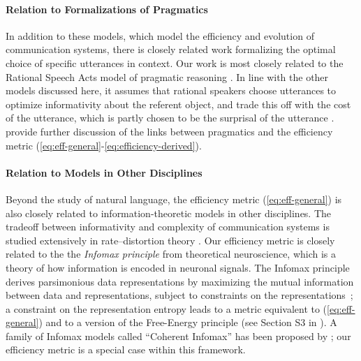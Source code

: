 \documentclass[10pt,twoside,lineno]{article}
\begin{document}
\paragraph{Relation to Formalizations of Pragmatics}
In addition to these models, which model the efficiency and evolution of communication systems, there is closely related work formalizing the optimal choice of specific utterances in context.
Our work is most closely related to the Rational Speech Acts model of pragmatic reasoning \cite{frank2012predicting,goodman2013knowledge, kao2014nonliteral}.
In line with the other models discussed here, it assumes that rational speakers choose utterances to optimize informativity about the referent object, and trade this off with the cost of the utterance, which is partly chosen to be the surprisal of the utterance \cite{bennett2018extremely, hahn2018information, peloquin2019interactions}.
\citet{peloquin2019interactions} provide further discussion of the links between pragmatics and the efficiency metric (\ref{eq:eff-general}-\ref{eq:efficiency-derived}).

\paragraph{Relation to Models in Other Disciplines}
Beyond the study of natural language, the efficiency metric (\ref{eq:eff-general}) is also closely related to information-theoretic models in other disciplines.
The tradeoff between informativity and complexity of communication systems is studied extensively in rate--distortion theory \cite{berger1971rate}.
Our efficiency metric is closely related to the the \emph{Infomax principle} from theoretical neuroscience, which is a theory of how information is encoded in neuronal signals.
The Infomax principle derives parsimonious data representations by maximizing the mutual information between data and representations, subject to constraints on the representations~\cite{linsker1988self}; a constraint on the representation entropy leads to a metric equivalent to (\ref{eq:eff-general}) and to a version of the Free-Energy principle (see Section S3 in \citet{friston2010free}).
A family of Infomax models called ``Coherent Infomax'' has been proposed by \citet{kay2011coherent}; our efficiency metric is a special case within this framework.


\end{document}

